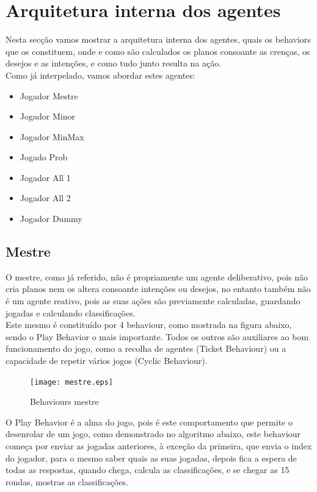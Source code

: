 \documentclass[12pt]{article}
\begin{document}
	
	\section*{Arquitetura interna dos agentes}
	
	Nesta secção vamos mostrar a arquitetura interna dos agentes, quais os behaviors que os constituem, onde e como são calculados os planos consoante as crenças, os desejos e as intenções, e como tudo junto resulta na ação.\\
	
    Como já interpelado, vamos abordar estes agentes:\\

    \begin{itemize}
        \item Jogador Mestre
        \item Jogador Minor
        \item Jogador MinMax
        \item Jogado Prob
        \item Jogador All 1
        \item Jogador All 2
        \item Jogador Dummy
    \end{itemize}
	
	
	\subsection*{Mestre}
	O mestre, como já referido, não é propriamente um agente deliberativo, pois não cria planos nem os altera consoante intenções ou desejos, no entanto também não é um agente reativo, pois as suas ações são previamente calculadas, guardando jogadas e calculando classificações.\\
    Este mesmo é constituído por 4 behaviour, como mostrada na figura abaixo, sendo o Play Behavior o mais importante. Todos os outros são auxiliares ao bom funcionamento do jogo, como a recolha de agentes (Ticket Behaviour) ou a capacidade de repetir vários jogos (Cyclic Behaviour).\\
    
    \begin{figure}[h]
		\centering
        \texttt{[image: mestre.eps]}
		\caption{Behaviours mestre}
		\label{fig:mestre}
	\end{figure}
	
	O Play Behavior é a alma do jogo, pois é este comportamento que permite o desenrolar de um jogo, como demonstrado no algoritmo abaixo, este behaviour começa por enviar as jogadas 
    anteriores, à exceção da primeira, que envia o index do jogador, para o mesmo saber quais as suas jogadas, depois fica a espera de todas as respostas, quando chega, calcula as classificações, e se chegar as 15 rondas, mostras as classificações.\\
\end{document}
